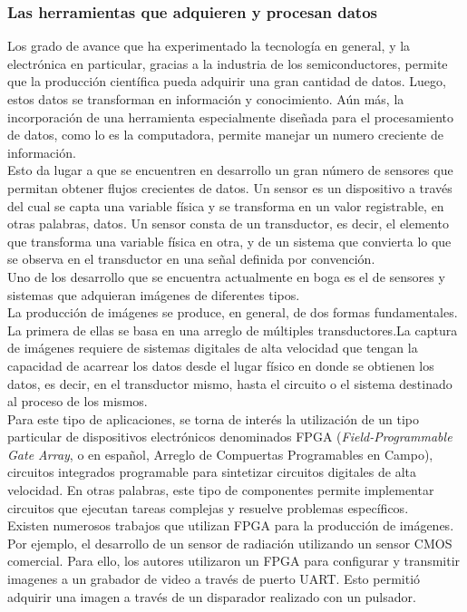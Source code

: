 \subsubsection*{Las herramientas que adquieren y procesan datos}
Los grado de avance que ha experimentado la tecnología en general, y la electrónica en particular, gracias a la industria de los semiconductores, permite que la producción científica pueda adquirir una gran cantidad de datos. Luego, estos datos se transforman en información y conocimiento. Aún más, la incorporación de una herramienta especialmente diseñada para el procesamiento de datos, como lo es la computadora, permite manejar un numero creciente de información.\\

Esto da lugar a que se encuentren en desarrollo un gran número de sensores que permitan obtener flujos crecientes de datos. Un sensor es un dispositivo a través del cual se capta una variable física y se transforma en un valor registrable, en otras palabras, datos. Un sensor consta de un transductor, es decir, el elemento que transforma una variable física en otra, y de un sistema que convierta lo que se observa en el transductor en una señal definida por convención.\\

Uno de los desarrollo que se encuentra actualmente en boga es el de sensores y sistemas que adquieran imágenes de diferentes tipos.\\

La producción de imágenes se produce, en general, de dos formas fundamentales. La primera de ellas se basa en una arreglo de múltiples transductores.La captura de imágenes requiere de sistemas digitales de alta velocidad que tengan la capacidad de acarrear los datos desde el lugar físico en donde se obtienen los datos, es decir, en el transductor mismo, hasta el circuito o el sistema destinado al proceso de los mismos.\\

Para este tipo de aplicaciones, se torna de interés la utilización de un tipo particular de dispositivos electrónicos denominados FPGA ({\it Field-Programmable Gate Array}, o en español, Arreglo de Compuertas Programables en Campo), circuitos integrados programable para sintetizar circuitos digitales de alta velocidad. En otras palabras, este tipo de componentes permite implementar circuitos que ejecutan tareas complejas y resuelve problemas específicos.\\

Existen numerosos trabajos que utilizan FPGA para la producción de imágenes. Por ejemplo, el desarrollo de un sensor de radiación utilizando un sensor CMOS comercial. Para ello, los autores utilizaron un FPGA para configurar y transmitir imagenes a un grabador de video a través de puerto UART. Esto permitió adquirir una imagen a través de un disparador realizado con un pulsador\cite{Perez2017}.\\

